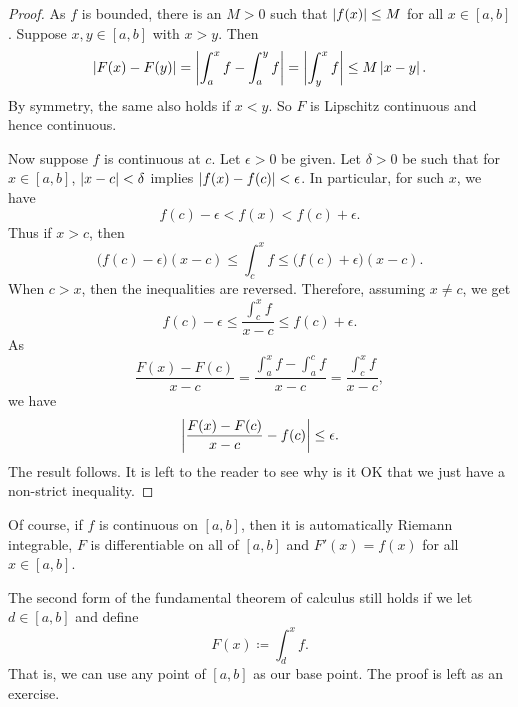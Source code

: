 \begin{proof}
As $f$ is bounded, there is an $M > 0$
such that $\left\lvert {f(x)} \right\rvert \leq M$ for all $x \in [a,b]$.  Suppose $x,y \in [a,b]$
with $x > y$.  Then
\begin{equation*}
\left\lvert {F(x)-F(y)} \right\rvert =
\left\lvert {\int_a^x f - \int_a^y f} \right\rvert
=
\left\lvert {\int_y^x f} \right\rvert
\leq
M\left\lvert {x-y} \right\rvert .
\end{equation*}
By symmetry, the same also holds if $x < y$.
So $F$ is Lipschitz continuous and hence continuous.

Now suppose $f$ is continuous at $c$.
Let $\epsilon > 0$ be given.  Let $\delta > 0$ be such that
for $x \in [a,b]$,
$\left\lvert {x-c} \right\rvert < \delta$ implies $\left\lvert {f(x)-f(c)} \right\rvert < \epsilon$.
In particular,
for such $x$, we have
\begin{equation*}
f(c)-\epsilon < f(x) < f(c) + \epsilon.
\end{equation*}
Thus if $x > c$, then
\begin{equation*}
\bigl(f(c)-\epsilon\bigr) (x-c) \leq \int_c^x f \leq
\bigl(f(c) + \epsilon\bigr)(x-c).
\end{equation*}
When $c > x$, then the inequalities are reversed.  Therefore,
assuming $x \not= c$, we get
\begin{equation*}
f(c)-\epsilon
\leq
\frac{\int_c^{x} f}{x-c}
\leq
f(c)+\epsilon .
\end{equation*}
As 
\begin{equation*}
\frac{F(x)-F(c)}{x-c}
=
\frac{\int_a^{x} f - \int_a^{c} f}{x-c}
=
\frac{\int_c^{x} f}{x-c} ,
\end{equation*}
we have 
\begin{equation*}
\left\lvert {\frac{F(x)-F(c)}{x-c} - f(c)} \right\rvert \leq \epsilon .
\end{equation*}
The result follows.  It is left to the reader to see why is it OK that we
just have a non-strict inequality.
\end{proof}

Of course, if $f$ is continuous on $[a,b]$, then it is automatically Riemann
integrable, $F$ is differentiable on all of $[a,b]$ and $F'(x) = f(x)$ for
all $x \in [a,b]$.

\begin{remark} \label{remark:fundthmbase}
The second form of the fundamental theorem of calculus still holds if
we let $d \in [a,b]$ and define
\begin{equation*}
F(x) \coloneqq \int_d^x f .
\end{equation*}
That is, we can use any point of $[a,b]$ as our base point.  The proof is
left as an exercise.
\end{remark}

